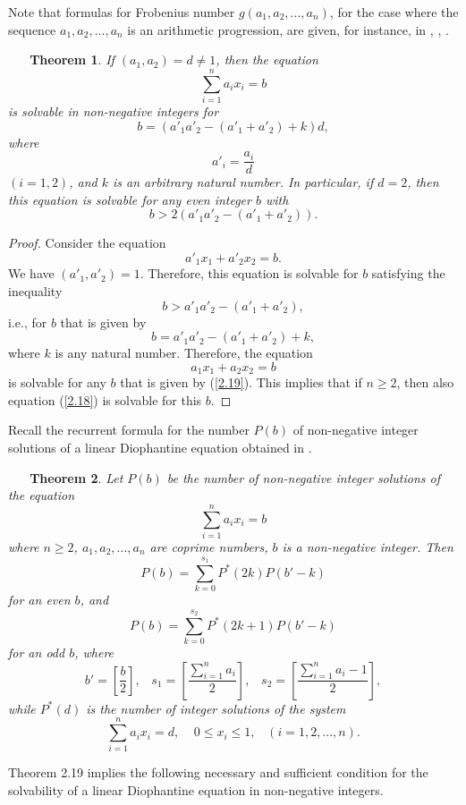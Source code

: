 \documentclass[12pt,reqno,intlim]{amsart}
\numberwithin{equation}{section}
\newtheorem{theo}{\ \ \ Theorem}[section]
\theoremstyle{definition}
\theoremstyle{remark}
\begin{document}
Note that formulas for Frobenius number $g(a_1,a_2,...,a_n)$, for the case where the sequence $a_1,a_2,...,a_n$ is an arithmetic progression, are given, for instance, in \cite{B}, \cite{R}, \cite{T}.

\begin{theo}
If $(a_1,a_2)=d\neq 1$, then the equation
\begin{equation}  \label{2.18}
\sum_{i=1}^{n}a_ix_i=b
\end{equation}
is solvable in non-negative integers for 
\begin{equation}  \label{2.19}
b=(a'_1a'_2-(a'_1+a'_2)+k)d,
\end{equation} where $$a'_i=\frac{a_i}{d}$$ $(i=1,2)$, and $k$ is an arbitrary natural number. In particular, if $d=2$, then this equation is solvable for any even integer $b$ with $$b>2(a'_1a'_2-(a'_1+a'_2)).$$
\end{theo}

\begin{proof}
Consider the equation
$$a'_1x_1+a'_2x_2=b.$$
We have $(a'_1,a'_2)=1$. Therefore, this equation is solvable for $b$ satisfying the inequality
$$b>a'_1a'_2-(a'_1+a'_2),$$ i.e., for $b$ that is given by
$$b=a'_1a'_2-(a'_1+a'_2)+k,$$ where $k$ is any natural number. Therefore, the equation
$$a_1x_1+a_2x_2=b$$
is solvable for any $b$ that is given by (\ref{2.19}). This implies that if $n\geq 2$, then also equation (\ref{2.18}) is solvable for this $b$.
\end{proof}

Recall the recurrent formula for the number $P(b)$ of non-negative integer solutions of a linear Diophantine equation obtained in \cite{S}. 

\begin{theo} \cite{S}
Let $P(b)$ be the number of non-negative integer solutions of the equation 
$$\sum_{i=1}^{n}a_ix_i=b$$
where $n\geq 2$, $a_1,a_2,...,a_n$ are coprime numbers, $b$ is a non-negative integer. Then
$$P(b)=\sum_{k=0}^{s_1}P^{\ast}(2k)P(b'-k)$$
for an even $b$, and
$$P(b)=\sum_{k=0}^{s_2}P^{\ast}(2k+1)P(b'-k)$$
for an odd $b$, where $$b'=\left[\frac{b}{2}\right], \;\;\; s_1=\left[\frac{\sum_{i=1}^{n}a_i}{2}\right], \;\;\;  s_2=\left[\frac{\sum_{i=1}^{n}a_i-1}{2}\right],$$ while
$P^{\ast}(d)$ is the number of integer solutions of the system
$$\sum_{i=1}^{n}a_ix_i=d, \;\;\;\; 0\leq x_i\leq 1,\;\;\; (i=1,2,...,n).$$
\end{theo}

Theorem 2.19 implies the following necessary and sufficient condition for the solvability of a linear Diophantine equation in non-negative integers.
\end{document}
